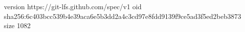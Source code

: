 version https://git-lfs.github.com/spec/v1
oid sha256:6c403bcc539b4e39aca6e5b3dd2a4c3cd97e8fdd9139f9ce5ad3f5ed2beb3873
size 1082
